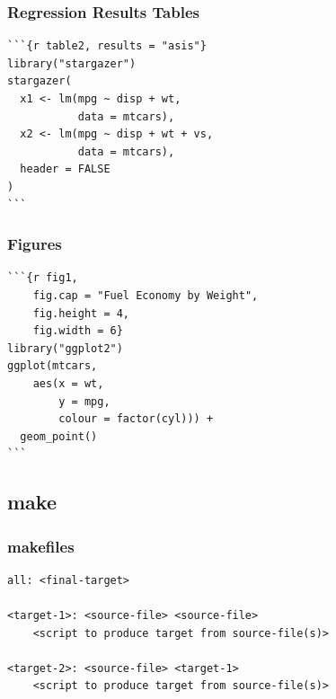 \documentclass[14pt]{beamer}
\begin{document}
\begin{frame}[fragile]
\frametitle{Regression Results Tables}
\begin{verbatim}
```{r table2, results = "asis"}
library("stargazer")
stargazer(
  x1 <- lm(mpg ~ disp + wt, 
           data = mtcars),
  x2 <- lm(mpg ~ disp + wt + vs, 
           data = mtcars),
  header = FALSE
)
```
\end{verbatim}
\end{frame}


\begin{frame}[fragile]
\frametitle{Figures}	
\begin{verbatim}
```{r fig1, 
    fig.cap = "Fuel Economy by Weight",
    fig.height = 4,
    fig.width = 6}
library("ggplot2")
ggplot(mtcars, 
    aes(x = wt, 
        y = mpg,
        colour = factor(cyl))) + 
  geom_point()
```
\end{verbatim}
\end{frame}





\subsection{make}
\frame{\tableofcontents[currentsubsection]}


\begin{frame}[fragile]
\frametitle{makefiles}

\scriptsize
\begin{verbatim}
all: <final-target>

<target-1>: <source-file> <source-file>
    <script to produce target from source-file(s)>

<target-2>: <source-file> <target-1>
    <script to produce target from source-file(s)>
\end{verbatim}
\end{frame}


\bgroup
{}
\begin{frame}[plain]{}
\end{frame}
\egroup
\end{document}
